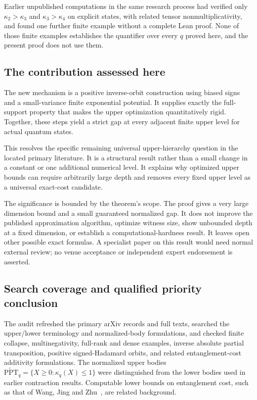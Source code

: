 \documentclass[11pt]{article}
\begin{document}
Earlier unpublished computations in the same research process had verified
only $\kappa_2>\kappa_3$ and $\kappa_3>\kappa_4$ on explicit states, with related
tensor nonmultiplicativity, and found one further finite example without a
complete Lean proof. None of those finite examples establishes the quantifier
over every $q$ proved here, and the present proof does not use them.

\subsection{The contribution assessed here}
The new mechanism is a positive inverse-orbit construction using biased
signs and a small-variance finite exponential potential. It supplies exactly
the full-support property that makes the upper optimization quantitatively
rigid. Together, these steps yield a strict gap at every adjacent finite
upper level for actual quantum states.

This resolves the specific remaining universal upper-hierarchy question in
the located primary literature. It is a structural result rather than a
small change in a constant or one additional numerical level. It explains
why optimized upper bounds can require arbitrarily large depth and removes
every fixed upper level as a universal exact-cost candidate.

The significance is bounded by the theorem's scope. The proof gives a very
large dimension bound and a small guaranteed normalized gap. It does not
improve the published approximation algorithm, optimize witness size, show
unbounded depth at a fixed dimension, or establish a computational-hardness
result. It leaves open other possible exact formulas. A specialist paper
on this result would need normal external review; no venue acceptance or
independent expert endorsement is asserted.

\subsection{Search coverage and qualified priority conclusion}
The audit refreshed the primary arXiv records and full texts, searched the
upper/lower terminology and normalized-body formulations, and checked
finite collapse, multinegativity, full-rank and dense examples, inverse
absolute partial transposition, positive signed-Hadamard orbits, and related
entanglement-cost additivity formulations. The normalized upper bodies
$\widetilde{\mathrm{PPT}}_q=\{X\ge0:\kappa_q(X)\le1\}$ were distinguished
from the lower bodies used in earlier contraction results. Computable lower
bounds on entanglement cost, such as that of Wang, Jing and Zhu~\cite{WJZ},
are related background.
\end{document}
